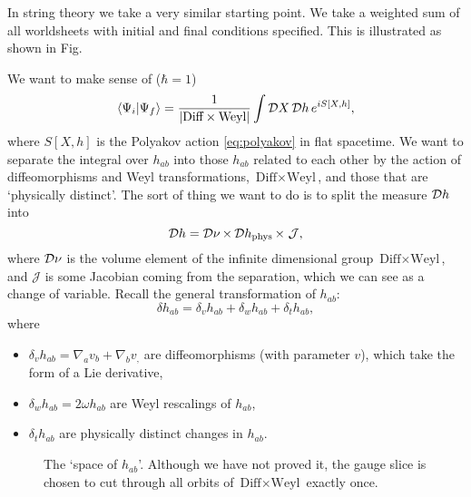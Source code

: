 In string theory we take a very similar starting point.
We take a weighted sum of all worldsheets with initial and final conditions specified. This is illustrated as shown in Fig. %

We want to make sense of ($\hbar = 1$)
\begin{equation}
  \bra{\Psi_i} \ket{\Psi_f} = \frac{1}{\abs{\text{Diff} \times \text{Weyl}}} \int \mathop{\mathcal{D} X} \mathop{\mathcal{D} h} e^{i S[X, h]},
\end{equation}
where $S[X, h]$ is the Polyakov action \eqref{eq:polyakov} in flat spacetime.
We want to separate the integral over $h_{ab}$ into those $h_{ab}$ related to each other by the action of diffeomorphisms and Weyl transformations, $\text{Diff} \times \text{Weyl}$, and those that are `physically distinct'.
The sort of thing we want to do is to split the measure $\mathop{\mathcal{D} h}$ into 
\begin{equation}
  \mathop{\mathcal{D} h} = \mathop{\mathcal{D} \nu} \times \mathop{\mathcal{D} h_{\text{phys}}} \times \; \mathcal{J},
\end{equation}
where $\mathop{\mathcal{D} \nu}$ is the volume element of the infinite dimensional group $\text{Diff} \times \text{Weyl}$, and $\mathcal{J}$ is some Jacobian coming from the separation, which we can see as a change of variable.
Recall the general transformation of $h_{ab}$:
\begin{equation}
  \label{eq:7-mt}
  \delta h_{ab} = \delta_v h_{ab} + \delta_w h_{ab} + \delta_t h_{ab},
\end{equation}
where 
\begin{itemize}
  \item $ \delta_v h_{ab} = \nabla_a v_b + \nabla_b v_, $ are diffeomorphisms (with parameter $v$), which take the form of a Lie derivative,
  \item $\delta_w h_{ab} = 2 \omega h_{ab}$ are Weyl rescalings of $h_{ab}$,
  \item $\delta_t h_{ab}$ are physically distinct changes in $h_{ab}$.
\end{itemize}
\begin{figure}[tbhp]
  \centering
  \def\svgwidth{0.4\columnwidth}
  
  \caption{The `space of $h_{ab}$'. Although we have not proved it, the gauge slice is chosen to cut through all orbits of $\text{Diff} \times \text{Weyl}$ exactly once.}
  \label{fig:l7f3}
\end{figure}


